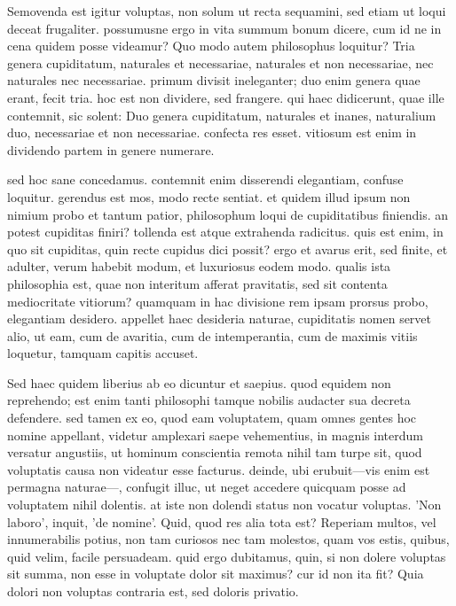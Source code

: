  Semovenda est igitur voluptas, non solum ut recta sequamini, sed etiam ut loqui deceat frugaliter. possumusne ergo in vita summum bonum dicere, cum id ne in cena quidem posse videamur? Quo modo autem philosophus loquitur? Tria genera cupiditatum, naturales et necessariae, naturales et non necessariae, nec naturales nec necessariae. primum divisit ineleganter; duo enim genera quae erant, fecit tria. hoc est non dividere, sed frangere. qui haec didicerunt, quae ille contemnit, sic solent: Duo genera cupiditatum, naturales et inanes, naturalium duo, necessariae et non necessariae. confecta res esset. vitiosum est enim in dividendo partem in genere numerare.

 sed hoc sane concedamus. contemnit enim disserendi elegantiam, confuse loquitur. gerendus est mos, modo recte sentiat. et quidem illud ipsum non nimium probo et tantum patior, philosophum loqui de cupiditatibus finiendis. an potest cupiditas finiri? tollenda est atque extrahenda radicitus. quis est enim, in quo sit cupiditas, quin recte cupidus dici possit? ergo et avarus erit, sed finite, et adulter, verum habebit modum, et luxuriosus eodem modo. qualis ista philosophia est, quae non interitum afferat pravitatis, sed sit contenta mediocritate vitiorum? quamquam in hac divisione rem ipsam prorsus probo, elegantiam desidero. appellet haec desideria naturae, cupiditatis nomen servet alio, ut eam, cum de avaritia, cum de intemperantia, cum de maximis vitiis loquetur, tamquam capitis accuset.

 Sed haec quidem liberius ab eo dicuntur et saepius. quod equidem non reprehendo; est enim tanti philosophi tamque nobilis audacter sua decreta defendere. sed tamen ex eo, quod eam voluptatem, quam omnes gentes hoc nomine appellant, videtur amplexari saepe vehementius, in magnis interdum versatur angustiis, ut hominum conscientia remota nihil tam turpe sit, quod voluptatis causa non videatur esse facturus. deinde, ubi erubuit—vis enim est permagna naturae—, confugit illuc, ut neget accedere quicquam posse ad voluptatem nihil dolentis. at iste non dolendi status non vocatur voluptas. 'Non laboro', inquit, 'de nomine'. Quid, quod res alia tota est? Reperiam multos, vel innumerabilis potius, non tam curiosos nec tam molestos, quam vos estis, quibus, quid velim, facile persuadeam. quid ergo dubitamus, quin, si non dolere voluptas sit summa, non esse in voluptate dolor sit maximus? cur id non ita fit? Quia dolori non voluptas contraria est, sed doloris privatio.

